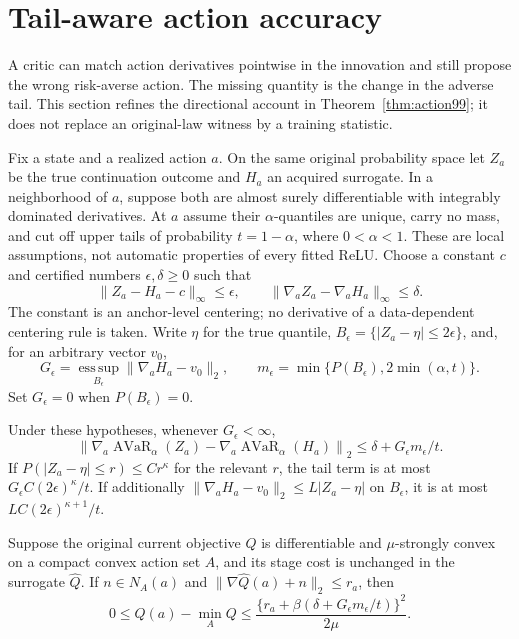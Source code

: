 \section{Tail-aware action accuracy}\label{sec:tail109}
A critic can match action derivatives pointwise in the innovation and still propose the wrong risk-averse action. The missing quantity is the change in the adverse tail. This section refines the directional account in Theorem~\ref{thm:action99}; it does not replace an original-law witness by a training statistic.

Fix a state and a realized action $a$. On the same original probability space let $Z_a$ be the true continuation outcome and $H_a$ an acquired surrogate. In a neighborhood of $a$, suppose both are almost surely differentiable with integrably dominated derivatives. At $a$ assume their $\alpha$-quantiles are unique, carry no mass, and cut off upper tails of probability $t=1-\alpha$, where $0<\alpha<1$. These are local assumptions, not automatic properties of every fitted ReLU. Choose a constant $c$ and certified numbers $\epsilon,\delta\ge0$ such that
\[
 \|Z_a-H_a-c\|_\infty\le\epsilon,\qquad
 \|\nabla_aZ_a-\nabla_aH_a\|_\infty\le\delta.
\]
The constant is an anchor-level centering; no derivative of a data-dependent centering rule is taken. Write $\eta$ for the true quantile, $B_\epsilon=\{|Z_a-\eta|\le2\epsilon\}$, and, for an arbitrary vector $v_0$,
\[
 G_\epsilon=\operatorname*{ess\,sup}_{B_\epsilon}\|\nabla_aH_a-v_0\|_2,
 \qquad m_\epsilon=\min\{P(B_\epsilon),2\min(\alpha,t)\}.
\]
Set $G_\epsilon=0$ when $P(B_\epsilon)=0$.
\begin{theorem}\label{thm:tail109}
Under these hypotheses, whenever $G_\epsilon<\infty$,
\begin{equation}\label{eq:tailgradient109}
 \left\|\nabla_a\operatorname{AVaR}_\alpha(Z_a)
       -\nabla_a\operatorname{AVaR}_\alpha(H_a)\right\|_2
 \le \delta+G_\epsilon m_\epsilon/t.
\end{equation}
If $P(|Z_a-\eta|\le r)\le Cr^\kappa$ for the relevant $r$, the tail term is at most $G_\epsilon C(2\epsilon)^\kappa/t$. If additionally
$\|\nabla_aH_a-v_0\|_2\le L|Z_a-\eta|$ on $B_\epsilon$, it is at most
$LC(2\epsilon)^{\kappa+1}/t$.

Suppose the original current objective $Q$ is differentiable and $\mu$-strongly convex on a compact convex action set $A$, and its stage cost is unchanged in the surrogate $\widehat Q$. If $n\in N_A(a)$ and $\|\nabla\widehat Q(a)+n\|_2\le r_a$, then
\begin{equation}\label{eq:tailaction109}
 0\le Q(a)-\min_AQ
 \le \frac{\{r_a+\beta(\delta+G_\epsilon m_\epsilon/t)\}^2}{2\mu}.
\end{equation}
\end{theorem}


